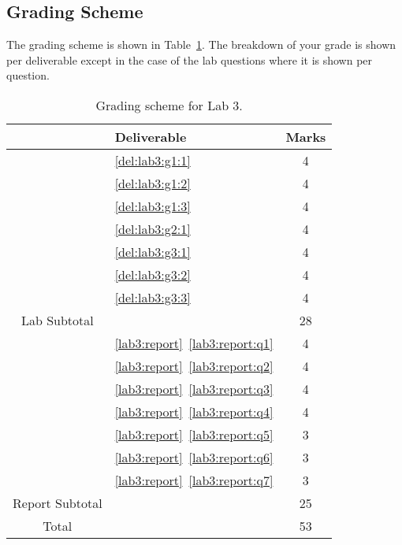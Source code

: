 \subsection{Grading Scheme}
The grading scheme is shown in Table~\ref{tab:lab3:grading}. The breakdown of
your grade is shown per deliverable except in the case of the lab
questions where it is shown per question.
%
\begin{table}
\centering
\begin{tabular}{c|l|c}
        & Deliverable           & Marks  \\ \hline
        & \ref{del:lab3:g1:1}         & 4       \\ \hline
        & \ref{del:lab3:g1:2}         & 4      \\ \hline
        & \ref{del:lab3:g1:3}        & 4       \\ \hline
        & \ref{del:lab3:g2:1}        & 4       \\ \hline
        & \ref{del:lab3:g3:1}         & 4      \\ \hline
        & \ref{del:lab3:g3:2}         & 4       \\ \hline
        & \ref{del:lab3:g3:3}         & 4       \\ \hhline{=|=|=}
Lab Subtotal&                       & 28      \\ \hhline{=|=|=}
        & \ref{lab3:report}~\ref{lab3:report:q1}  & 4       \\ \hline
        & \ref{lab3:report}~\ref{lab3:report:q2}  & 4       \\ \hline
        & \ref{lab3:report}~\ref{lab3:report:q3}  & 4       \\ \hline
        & \ref{lab3:report}~\ref{lab3:report:q4}  & 4       \\ \hline
        & \ref{lab3:report}~\ref{lab3:report:q5}  & 3      \\ \hline
        & \ref{lab3:report}~\ref{lab3:report:q6}  & 3      \\ \hline
        & \ref{lab3:report}~\ref{lab3:report:q7}  & 3      \\ \hhline{=|=|=}
Report Subtotal&  & 25 \\ \hhline{=|=|=}
  Total &                       & 53
\end{tabular}
\caption[Grading Scheme for Lab 3]{Grading scheme for Lab 3.}
\label{tab:lab3:grading}
\end{table}
%
